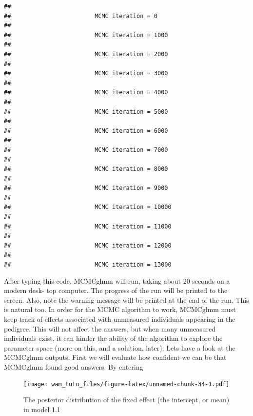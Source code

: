 \documentclass[
  12pt,
]{book}
\newenvironment{Shaded}{\begin{snugshade}}{\end{snugshade}}
\newcommand{\FloatTok}[1]{\textcolor[rgb]{0.00,0.00,0.81}{#1}}
\newcommand{\FunctionTok}[1]{\textcolor[rgb]{0.00,0.00,0.00}{#1}}
\newcommand{\NormalTok}[1]{#1}
\newcommand{\SpecialCharTok}[1]{\textcolor[rgb]{0.00,0.00,0.00}{#1}}
\begin{document}
\begin{verbatim}
## 
##                        MCMC iteration = 0
## 
##                        MCMC iteration = 1000
## 
##                        MCMC iteration = 2000
## 
##                        MCMC iteration = 3000
## 
##                        MCMC iteration = 4000
## 
##                        MCMC iteration = 5000
## 
##                        MCMC iteration = 6000
## 
##                        MCMC iteration = 7000
## 
##                        MCMC iteration = 8000
## 
##                        MCMC iteration = 9000
## 
##                        MCMC iteration = 10000
## 
##                        MCMC iteration = 11000
## 
##                        MCMC iteration = 12000
## 
##                        MCMC iteration = 13000
\end{verbatim}

After typing this code, MCMCglmm will run, taking about 20 seconds on a modern desk- top computer. The progress of the run will be printed to the screen. Also, note the warning message will be printed at the end of the run. This is natural too. In order for the MCMC algorithm to work, MCMCglmm must keep track of effects associated with unmeasured individuals appearing in the pedigree. This will not affect the answers, but when many unmeasured individuals exist, it can hinder the ability of the algorithm to explore the parameter space (more on this, and a solution, later). Lets have a look at the MCMCglmm outputs. First we will evaluate how confident we can be that MCMCglmm found good answers. By entering

\begin{Shaded}
\end{Shaded}

\begin{figure}
\centering
\texttt{[image: wam\_tuto\_files/figure-latex/unnamed-chunk-34-1.pdf]}
\caption{\label{fig:unnamed-chunk-34}The posterior distribution of the fixed effect (the intercept, or mean) in model 1.1}
\end{figure}
\end{document}
